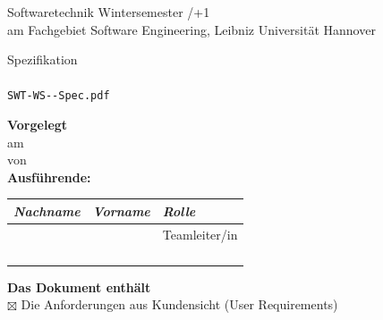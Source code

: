 \documentclass[a4paper, 12pt]{article}
\newcommand*{\swtdate}[0]{\the\year/\the\numexpr\year+1}
\newcommand*{\swtdateshort}[0]{\the\year}
\begin{document}
	\thispagestyle{empty} %
	\begin{center}
		{\Huge Softwaretechnik Wintersemester \swtdate}\\[.35cm]
		{\large am Fachgebiet Software Engineering, Leibniz Universität Hannover}\\[.1cm]
	\end{center}
	\begin{center}
	\colorbox{lightlightgray}{
		\begin{minipage}{\linewidth}
			\begin{center}
				\vspace{0.2cm}
				{\Huge Spezifikation}\\[.1cm]
				{\Huge \projectName}\\[.3cm]
				\texttt{SWT-WS\swtdateshort{}-{\projectLeadSurname}-Spec.pdf}
				\vspace{0.2cm}
			\end{center}
		\end{minipage}
	}
	\end{center}
	\textbf{Vorgelegt}\\
		\hspace*{1cm}am \submissionDate \\
		\hspace*{1cm}von \projectName\\[0.2cm]
	\textbf{Ausführende:}
		\begin{center}
			\begin{tabular}{|l|l|l|}
				\hline
				\textit{Nachname} 		& \textit{Vorname}          & \textit{Rolle} \\ \hline\hline
				\projectLeadSurname		& \projectLeadFirstname		& Teamleiter/in\\ \hline
				\developerZeroSurname	& \developerZeroFirstname	& \roleDeveloperZero\\ \hline
				\developerOneSurname	& \developerOneFirstname	& \roleDeveloperOne\\ \hline
				\developerTwoSurname	& \developerTwoFirstname	& \roleDeveloperTwo\\ \hline
				\developerThreeSurname	& \developerThreeFirstname	& \roleDeveloperThree\\ \hline
			\end{tabular}
		\end{center}
		\vspace{0.3cm}
	\textbf{Das Dokument enthält}\\[0.1cm]
		\hspace*{1cm}$\boxtimes$ Die Anforderungen aus Kundensicht (User Requirements)\\[0.1cm]
\end{document}
